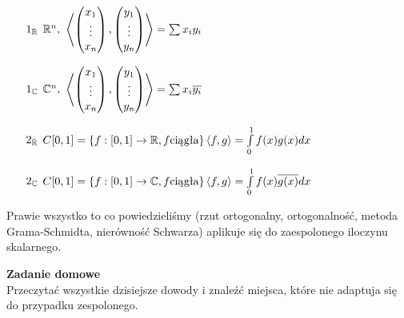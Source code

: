 \begin{prz} \hfill 
    \begin{itemize} 
        \item[$1_{\mathbb{R}}$] $\mathbb{R}^n, \ \left\langle \begin{pmatrix} x_1 \\ \vdots \\ x_n \end{pmatrix}, \begin{pmatrix} y_1 \\ \vdots \\ y_n \end{pmatrix} \right\rangle = \sum x_i y_i$
        \item[$1_{\mathbb{C}}$] $\mathbb{C}^n, \ \left\langle \begin{pmatrix} x_1 \\ \vdots \\ x_n \end{pmatrix}, \begin{pmatrix} y_1 \\ \vdots \\ y_n \end{pmatrix} \right\rangle = \sum x_i\overline{y_i}$ 
        \item[$2_{\mathbb{R}}$] $C[0,1] = \{ f:[0,1] \to \mathbb{R}, f \text{ciągła} \} \\ 
            \left\langle f, g \right\rangle = \int\limits_0^1 f(x) g(x) dx$
        \item[$2_{\mathbb{C}}$] $C[0,1] = \{ f:[0,1] \to \mathbb{C}, f \text{ciągła} \} \\ 
            \left\langle f, g \right\rangle = \int\limits_0^1 f(x) \overline{g(x)} dx$
    \end{itemize} 
\end{prz} 
\begin{uw} 
    Prawie wszystko to co powiedzieliśmy (rzut ortogonalny, ortogonalność, 
    metoda Grama-Schmidta, nierówność Schwarza) 
    aplikuje się do zaespolonego iloczynu skalarnego. 
\end{uw} 
\textbf{Zadanie domowe} \\ 
Przeczytać wszystkie dzisiejsze dowody i znaleźć miejsca, które nie adaptuja się do 
przypadku zespolonego.
